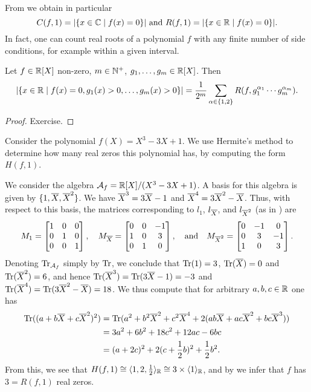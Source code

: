 \documentclass[12pt, leqno, british]{amsart}
\begin{document}
From  we obtain in particular
\begin{displaymath}
C(f, 1) = \lvert \lbrace x \in \mathbb C \mid f(x) = 0 \rbrace\rvert \text{ and } R(f, 1) =  \lvert \lbrace x \in \mathbb R \mid f(x) = 0 \rbrace \rvert.
\end{displaymath}
In fact, one can count real roots of a polynomial $f$ with any finite number of side conditions, for example within a given interval.
\begin{cor}\label{C:Hermite}
Let $f \in \mathbb R[X]$ non-zero, $m \in \mathbb N^+$, $g_1, \ldots, g_m \in \mathbb R[X]$.
Then
$$ \lvert \lbrace x \in \mathbb R \mid f(x) = 0, g_1(x) > 0, \ldots, g_m(x) > 0 \rbrace \rvert = \frac{1}{2^m} \sum_{\alpha \in \lbrace 1, 2 \rbrace} R(f, g_1^{\alpha_1} \cdots g_m^{\alpha_m}). $$
\end{cor}
\begin{proof}
Exercise.
\end{proof}
\begin{eg}
Consider the polynomial $f(X) = X^3 - 3X + 1$. We use Hermite's method to determine how many real zeros this polynomial has, by computing the form $H(f, 1)$.

We consider the algebra $\mathcal{A}_f = \mathbb R[X]/(X^3 - 3X + 1)$.
A basis for this algebra is given by $\lbrace 1, \overline{X}, \overline{X}^2 \rbrace$.
We have $\overline{X}^3 = 3\overline{X} - 1$ and $\overline{X}^4 = 3\overline{X}^2 - \overline{X}$.
Thus, with respect to this basis, the matrices corresponding to $l_1$, $l_{\overline{X}}$, and $l_{\overline{X}^2}$ (as in ) are
\begin{displaymath}
M_1 = \begin{bmatrix}
1 & 0 & 0 \\
0 & 1 & 0 \\
0 & 0 & 1
\end{bmatrix}, \quad M_{\overline{X}} = \begin{bmatrix}
0 & 0 & -1 \\
1 & 0 & 3 \\
0 & 1 & 0
\end{bmatrix}, \quad \text{and} \quad M_{\overline{X}^2} = \begin{bmatrix}
0 & -1 & 0 \\
0 & 3 & -1 \\
1 & 0 & 3
\end{bmatrix}.
\end{displaymath}
Denoting $\operatorname{Tr}_{\mathcal{A}_f}$ simply by $\operatorname{Tr}$, we conclude that $\operatorname{Tr}(1) = 3$, $\operatorname{Tr}(\overline{X}) = 0$ and $\operatorname{Tr}(\overline{X}^2) = 6$, and hence $\operatorname{Tr}(\overline{X}^3) = \operatorname{Tr}(3\overline{X} - 1) = -3$ and $\operatorname{Tr}(\overline{X}^4) = \operatorname{Tr}(3\overline{X}^2 - \overline{X}) = 18$.
We thus compute that for arbitrary $a, b, c \in \mathbb R$ one has
\begin{align*}
\operatorname{Tr}((a + b\overline{X} + c\overline{X}^2)^2) &= \operatorname{Tr}(a^2 + b^2\overline{X}^2 + c^2\overline{X}^4 + 2(ab\overline{X} + ac\overline{X}^2 + bc\overline{X}^3)) \\
&= 3a^2 + 6b^2 + 18c^2 + 12ac - 6bc \\
&= (a + 2c)^2 + 2(c + \frac{1}{2}b)^2 + \frac{1}{2}b^2.
\end{align*}
From this, we see that $H(f, 1) \cong \langle 1, 2, \frac{1}{2} \rangle_\mathbb R \cong 3 \times \langle 1 \rangle_\mathbb R$, and by  we infer that $f$ has $3 = R(f, 1)$ real zeros.
\end{eg}
\end{document}
